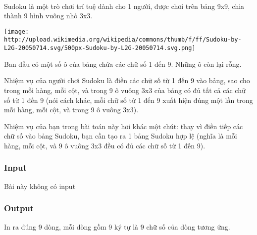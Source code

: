 

 

Sudoku là một trò chơi trí tuệ dành cho 1 người, được chơi trên bảng 9x9, chia thành 9 hình vuông nhỏ 3x3.


\texttt{[image: http://upload.wikimedia.org/wikipedia/commons/thumb/f/ff/Sudoku-by-L2G-20050714.svg/500px-Sudoku-by-L2G-20050714.svg.png]}

Ban đầu có một số ô của bảng chứa các chữ số 1 đến 9. Những ô còn lại rỗng.

Nhiệm vụ của người chơi Sudoku là điền các chữ số từ 1 đến 9 vào bảng, sao cho trong mỗi hàng, mỗi cột, và trong 9 ô vuông 3x3 của bảng có đủ tất cả các chữ số từ 1 đến 9 (nói cách khác, mỗi chữ số từ 1 đến 9 xuất hiện đúng một lần trong mỗi hàng, mỗi cột, và trong 9 ô vuông 3x3).

Nhiệm vụ của bạn trong bài toán này hơi khác một chút: thay vì điền tiếp các chữ số vào bảng Sudoku, bạn cần tạo ra 1 bảng Sudoku hợp lệ (nghĩa là mỗi hàng, mỗi cột, và 9 ô vuông 3x3 đều có đủ các chữ số từ 1 đến 9).

\subsubsection{Input}

Bài này không có input

\subsubsection{Output}

In ra đúng 9 dòng, mỗi dòng gồm 9 ký tự là 9 chữ số của dòng tương ứng.

